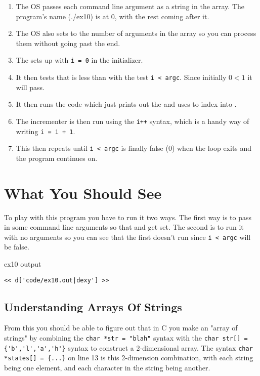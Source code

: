 \begin{enumerate}
\item The OS passes each command line argument as a string in the 
    array.  The program's name (./ex10) is at 0, with the rest coming after it.
\item The OS also sets  to the number of arguments in the 
    array so you can process them without going past the end.
\item The  sets up with \verb|i = 0| in the initializer.
\item It then tests that  is less than  with the
    test \verb|i < argc|. Since initially $0 < 1$ it will pass.
\item It then runs the code which just prints out the  and 
    uses  to index into .
\item The incrementer is then run using the \verb|i++| syntax, which is
    a handy way of writing \verb|i = i + 1|.
\item This then repeats until \verb|i < argc| is finally false (0) when
    the loop exits and the program continues on.
\end{enumerate}


\section{What You Should See}

To play with this program you have to run it two ways.  The first way is to
pass in some command line arguments so that  and 
get set.  The second is to run it with no arguments so you can see that
the first  doesn't run since \verb|i < argc| will be false.

\begin{code}{ex10 output}
\begin{lstlisting}
<< d['code/ex10.out|dexy'] >>
\end{lstlisting}
\end{code}

\subsection{Understanding Arrays Of Strings}

From this you should be able to figure out that in C you make an "array of
strings" by combining the \verb|char *str = "blah"| syntax with the
\verb|char str[] = {'b','l','a','h'}| syntax to construct a 2-dimensional
array.  The syntax \verb|char *states[] = {...}| on line 13 is this
2-dimension combination, with each string being one element, and each
character in the string being another.

